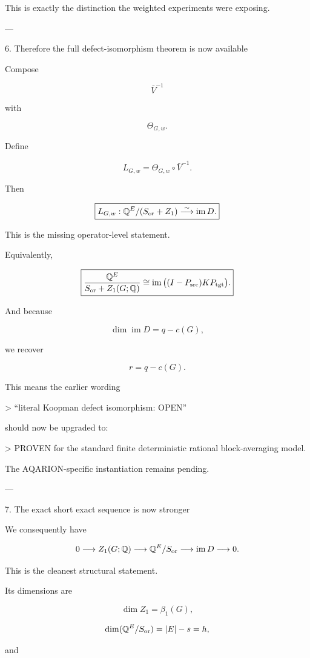 This is exactly the distinction the weighted experiments were exposing.


---

6. Therefore the full defect-isomorphism theorem is now available

Compose

\[
\bar V^{-1}
\]

with

\[
\Theta_{G,w}.
\]

Define

\[
\boxed{
L_{G,w}
=
\Theta_{G,w}\circ\bar V^{-1}.
}
\]

Then

\[
\boxed{
L_{G,w}:
\mathbb Q^E/(S_{\rm or}+Z_1)
\stackrel{\sim}{\longrightarrow}
\operatorname{im}D.
}
\]

This is the missing operator-level statement.

Equivalently,

\[
\boxed{
\frac{\mathbb Q^E}
{S_{\rm or}+Z_1(G;\mathbb Q)}
\cong
\operatorname{im}
\big((I-P_{\rm src})KP_{\rm tgt}\big).
}
\]

And because

\[
\dim\operatorname{im}D=q-c(G),
\]

we recover

\[
\boxed{
r=q-c(G).
}
\]

This means the earlier wording

> “literal Koopman defect isomorphism: OPEN”



should now be upgraded to:

> PROVEN for the standard finite deterministic rational block-averaging model.



The AQARION-specific instantiation remains pending.


---

7. The exact short exact sequence is now stronger

We consequently have

\[
0
\longrightarrow
Z_1(G;\mathbb Q)
\longrightarrow
\mathbb Q^E/S_{\rm or}
\longrightarrow
\operatorname{im}D
\longrightarrow0.
\]

This is the cleanest structural statement.

Its dimensions are

\[
\dim Z_1=\beta_1(G),
\]

\[
\dim(\mathbb Q^E/S_{\rm or})=|E|-s=h,
\]

and

